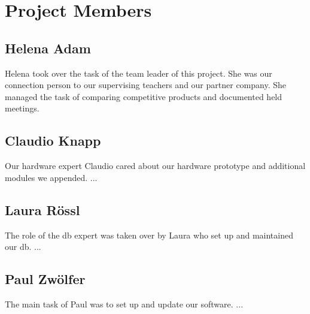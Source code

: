 \chapter*{Project Members}
\section*{Helena Adam}
Helena took over the task of the team leader of this project. She was our connection person to our supervising teachers and our partner company. She managed the task of comparing competitive products and documented held meetings.
\begin{center}
\end{center}
\section*{Claudio Knapp}
Our hardware expert Claudio cared about our hardware prototype and additional modules we appended. ...
\begin{center}
\end{center}
\section*{Laura Rössl}
The role of the \gls{db} expert was taken over by Laura who set up and maintained our \gls{db}. ...
\begin{center}
\end{center}
\section*{Paul Zwölfer}
The main task of Paul was to set up and update our software. ...
\begin{center}
\end{center}